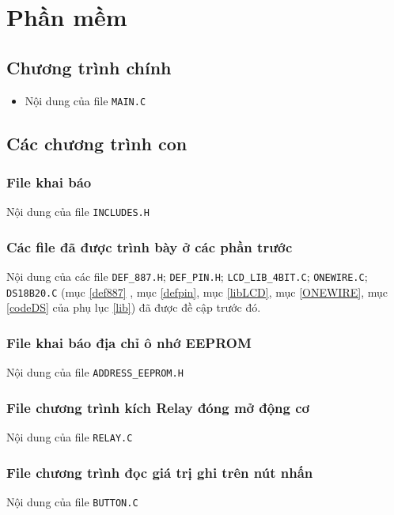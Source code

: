 \chapter{Phần mềm}
\section{Chương trình chính}
\begin{itemize}
\item[]Nội dung của file \verb|MAIN.C|

\end{itemize}
\section{Các chương trình con}
\subsection{File khai báo}
\begin{list}{}{}
\item Nội dung của file \verb|INCLUDES.H|

\end{list}
\subsection{Các file đã được trình bày ở các phần trước}
Nội dung của các file \verb|DEF_887.H|; \verb|DEF_PIN.H|; \verb|LCD_LIB_4BIT.C|; \verb|ONEWIRE.C|; \verb|DS18B20.C| (mục \ref{def887} , mục \ref{defpin}, mục \ref{libLCD}, mục \ref{ONEWIRE}, mục \ref{codeDS} của phụ lục \ref{lib}) đã được đề cập trước đó.
\subsection{File khai báo địa chỉ ô nhớ EEPROM}
\begin{list}{}{}
\item Nội dung của file \verb|ADDRESS_EEPROM.H|

\subsection{File chương trình kích Relay đóng mở động cơ}
\begin{list}{}{}
\item Nội dung của file \verb|RELAY.C|

\end{list}
\subsection{File chương trình đọc giá trị ghi trên nút nhấn}

Nội dung của file \verb|BUTTON.C|

\end{list}